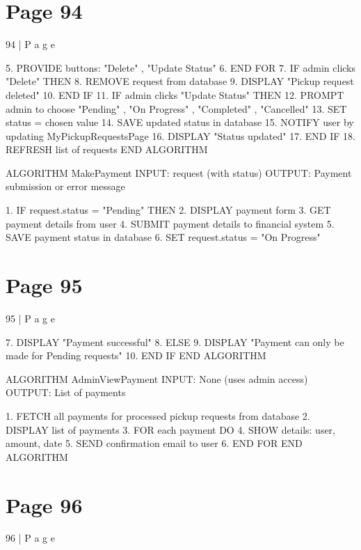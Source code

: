 \documentclass{article}
\begin{document}
\section*{Page 94}
94 | P a g e 
 
    5. PROVIDE buttons: "Delete" , "Update Status" 
6. END FOR 
7. IF admin clicks "Delete" THEN 
    8. REMOVE request from database 
    9. DISPLAY "Pickup request deleted" 
10. END IF 
11. IF admin clicks "Update Status" THEN 
    12. PROMPT admin to choose "Pending" , "On Progress" , "Completed" , "Cancelled" 
    13. SET status = chosen value 
    14. SAVE updated status in database 
    15. NOTIFY user by updating MyPickupRequestsPage 
    16. DISPLAY "Status updated" 
17. END IF 
18. REFRESH list of requests 
END ALGORITHM 
 
ALGORITHM MakePayment 
INPUT: request (with status) 
OUTPUT: Payment submission or error message 
  
1. IF request.status = "Pending" THEN 
    2. DISPLAY payment form 
    3. GET payment details from user 
    4. SUBMIT payment details to financial system 
    5. SAVE payment status in database 
    6. SET request.status = "On Progress" 

\section*{Page 95}
95 | P a g e 
 
    7. DISPLAY "Payment successful" 
8. ELSE 
    9. DISPLAY "Payment can only be made for Pending requests" 
10. END IF 
END ALGORITHM 
 
ALGORITHM AdminViewPayment 
INPUT: None (uses admin access) 
OUTPUT: List of payments 
  
1. FETCH all payments for processed pickup requests from database 
2. DISPLAY list of payments 
3. FOR each payment DO 
    4. SHOW details: user, amount, date 
    5. SEND confirmation email to user 
6. END FOR 
END ALGORITHM 
 
 
 
 
 
 
 
 

\section*{Page 96}
96 | P a g e 
 
 
 
\end{document}
